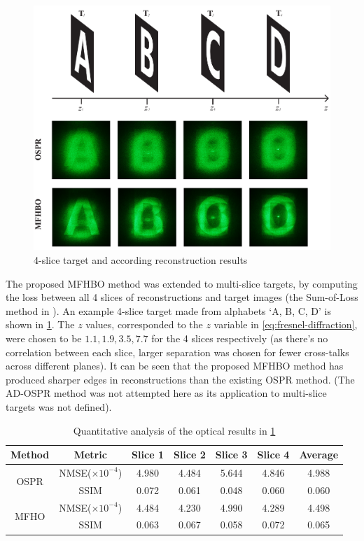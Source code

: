 	\begin{figure}[h!t]
		\centering
		\includegraphics[width=1.0\textwidth]{MFHO_OSPR_ABCD.pdf}
		\caption{4-slice target and according reconstruction results}
		\label{fig:MFHO_OSPR_ABCD}
	\end{figure}
	
	The proposed MFHBO method was extended to multi-slice targets, by computing the loss between all 4 slices of reconstructions and target images (the Sum-of-Loss method in \cite{Sha2023}). An example 4-slice target made from alphabets `A, B, C, D' is shown in \cref{fig:MFHO_OSPR_ABCD}. The $z$ values, corresponded to the $z$ variable in \cref{eq:fresnel-diffraction}, were chosen to be $1.1, 1.9, 3.5, 7.7$ for the 4 slices respectively (as there's no correlation between each slice, larger separation was chosen for fewer cross-talks across different planes). It can be seen that the proposed MFHBO method has produced sharper edges in reconstructions than the existing OSPR method. (The AD-OSPR method was not attempted here as its application to multi-slice targets was not defined). 
	
	\begin{table}[H]
	\centering
	\begin{tabular}{|c|c|c|c|c|c|c|}
	\hline
	\textbf{Method} & \textbf{Metric} & \textbf{Slice 1} & \textbf{Slice 2} & \textbf{Slice 3} & \textbf{Slice 4} & \textbf{Average} \\ \hline
	\multirow{2}{*}{OSPR} & NMSE($\times 10^{-4}$) & 4.980 & 4.484 & 5.644 & 4.846 & 4.988 \\ \cline{2-7} 
						  & SSIM                   & 0.072 & 0.061 & 0.048 & 0.060 & 0.060 \\ \hline
	\multirow{2}{*}{MFHO} & NMSE($\times 10^{-4}$) & 4.484 & 4.230 & 4.990 & 4.289 & 4.498 \\ \cline{2-7} 
						  & SSIM                   & 0.063 & 0.067 & 0.058 & 0.072 & 0.065 \\ \hline
	\end{tabular}
	\caption{Quantitative analysis of the optical results in \cref{fig:MFHO_OSPR_ABCD}}
	\label{tab:quant_MFHO_OSPR_ABCD}
	\end{table}
	
